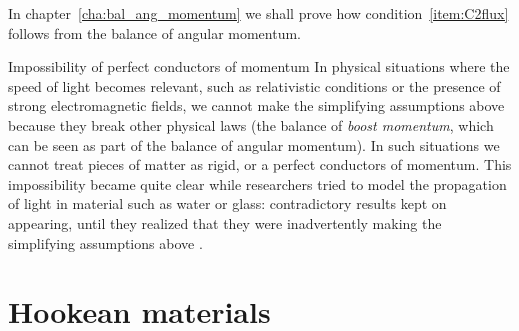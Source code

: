 \documentclass[a4paper,12pt,%
onecolumn,oneside,%
british%
]{memoir}
\renewcommand*{\bm}[1]{\textpdfrender{TextRenderingMode=2,LineWidth=0.2pt}{\boldsymbol{#1}}}
\newcommand*{\di}{\mathrm{d}}%
\renewcommand*{\|}[1][]{\nonscript\:#1\vert\nonscript\:\mathopen{}}
\newcommand*{\chap}{chapter}%
\newcommand*{\masse}{mass-energy}
\newcommand*{\dt}{\di t}
\newcommand*{\yP}{\bm{P}}
\newcommand*{\yF}{\bm{F}}
\newcommand*{\yFa}{\yF_{a}}
\newcommand*{\yFb}{\yF_{b}}
\newcommand*{\yG}{\bm{G}}
\begin{document}
% 

In \chap~\ref{cha:bal_ang_momentum} we shall prove how condition~\ref{item:C2flux} follows from the balance of angular momentum.

\begin{extra}{Impossibility of perfect conductors of momentum}
In physical situations where the speed of light becomes relevant, such as relativistic conditions or the presence of strong electromagnetic fields, we cannot make the simplifying assumptions above because they break other physical laws (the balance of \emph{boost momentum}, which can be seen as part of the balance of angular momentum). In such situations we cannot treat pieces of matter as rigid, or a perfect conductors of momentum. This impossibility became quite clear while researchers tried to model the propagation of light in material such as water or glass: contradictory results kept on appearing, until they realized that they were inadvertently making the simplifying assumptions above \autocites{pfeiferetal2007}.
\end{extra}

\section{Hookean materials}
\label{sec:hooke}
\end{document}
